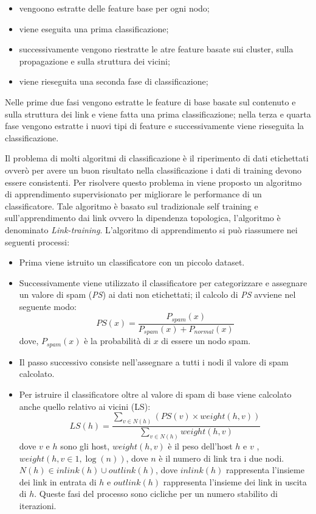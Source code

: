 \begin{itemize}
 \item vengoono estratte delle feature base per ogni nodo;
 \item viene eseguita una prima classificazione;
 \item successivamente vengono riestratte le atre feature basate sui cluster, sulla propagazione e sulla struttura dei vicini;
 \item viene rieseguita una seconda fase di classificazione;
\end{itemize}
Nelle prime due fasi vengono estratte le feature di base basate sul contenuto e sulla struttura dei link e viene fatta una prima classificazione; nella terza e quarta fase vengono estratte i nuovi tipi di feature e successivamente viene rieseguita la classificazione.

Il problema di molti algoritmi di classificazione è il riperimento di dati etichettati ovverò per avere un buon risultato nella classificazione i dati di training devono essere consistenti. Per risolvere questo problema in \cite{Geng:2009:LBS:1526709.1526920} viene proposto un algoritmo di apprendimento supervisionato per migliorare le performance di un classificatore. Tale algoritmo è basato sul tradizionale self training e sull'apprendimento dai link ovvero la dipendenza topologica, l'algoritmo è denominato \textit{Link-training}. L'algoritmo di apprendimento si può riassumere nei seguenti processi:
\begin{itemize}
 \item Prima viene istruito un classificatore con un piccolo dataset.
 \item Successivamente viene utilizzato il classificatore per categorizzare e assegnare un valore di spam (\textit{PS}) ai dati non etichettati; il calcolo di \textit{PS} avviene nel seguente modo:
 \begin{equation}
  PS(x)=\frac{P_{spam}(x)}{P_{spam}(x)+P_{normal}(x)}
 \end{equation}
 dove, \(P_{spam}(x)\) è la probabilità di \(x\) di essere un nodo spam.
 \item Il passo successivo consiste nell'assegnare a tutti i nodi il valore di spam calcolato.
 \item Per istruire il classificatore oltre al valore di spam di base viene calcolato anche quello relativo ai vicini (LS):
 \begin{equation}
LS(h)=\frac{\sum_{v\in N(h)}(PS(v)\times weight(h,v))}{\sum_{v\in N(h)}weight(h,v)}
 \end{equation}
dove \(v\) e \(h\) sono gli host, \(weight(h,v)\) è il peso dell'host \(h\) e \(v\) , \(weight(h,v\in {1,\log{(n)}})\), dove \(n\) è il numero di link tra i due nodi. \(N(h)\in inlink(h) \cup outlink(h)\), dove \(inlink(h)\) rappresenta l'insieme dei link in entrata di \(h\) e \(outlink(h)\) rappresenta l'insieme dei link in uscita di \(h\). 
Queste fasi del processo sono cicliche per un numero stabilito di iterazioni.
\end{itemize}

